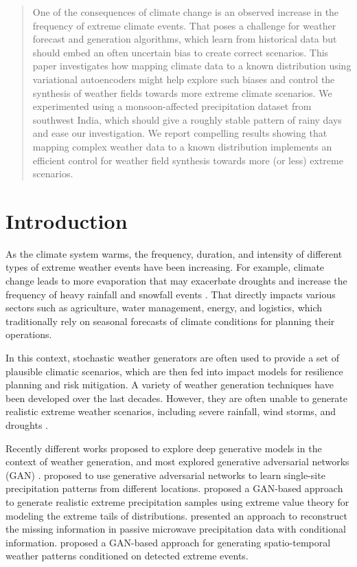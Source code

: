 \documentclass{article}
\begin{document}
\begin{abstract}
One of the consequences of climate change is an observed increase in the frequency of extreme climate events. That poses a challenge for weather forecast and generation algorithms, which learn from historical data but should embed an often uncertain bias to create correct scenarios. This paper investigates how mapping climate data to a known distribution using variational autoencoders might help explore such biases and control the synthesis of weather fields towards more extreme climate scenarios. We experimented using a monsoon-affected precipitation dataset from southwest India, which should give a roughly stable pattern of rainy days and ease our investigation. We report compelling results showing that mapping complex weather data to a known distribution implements an efficient control for weather field synthesis towards more (or less) extreme scenarios.
\end{abstract}

\section{Introduction}
\label{introduction}

As the climate system warms, the frequency, duration, and intensity of different types of extreme weather events have been increasing. For example, climate change leads to more evaporation that may exacerbate droughts and increase the frequency of heavy rainfall and snowfall events \cite{NAS2016}. That directly impacts various sectors such as agriculture, water management, energy, and logistics, which traditionally rely on seasonal forecasts of climate conditions for planning their operations. 

In this context, stochastic weather generators are often used to provide a set of plausible climatic scenarios, which are then fed into impact models for resilience planning and risk mitigation. A variety of weather generation techniques have been developed over the last decades. However, they are often unable to generate realistic extreme weather scenarios, including severe rainfall, wind storms, and droughts \cite{Verdin2018}.

Recently different works proposed to explore deep generative models in the context of weather generation, and most explored generative adversarial networks (GAN) \cite{goodfellow}. \cite{ibm_wg} proposed to use generative adversarial networks to learn single-site precipitation patterns from different locations. \cite{exgan} proposed a GAN-based approach to generate realistic extreme precipitation samples using extreme value theory for modeling the extreme tails of distributions. \cite{precipgan} presented an approach to reconstruct the missing information in passive microwave precipitation data with conditional information. \cite{klemmer2021generative} proposed a GAN-based approach for generating spatio-temporal weather patterns conditioned on detected extreme events.
\end{document}

